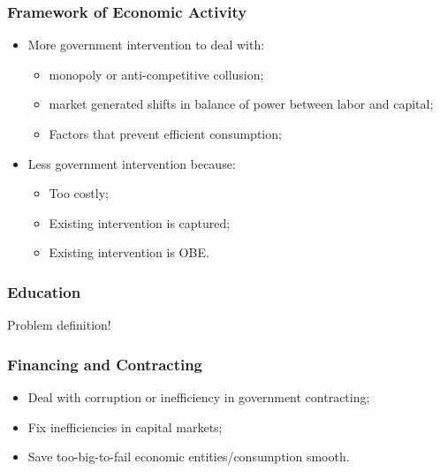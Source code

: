 \documentclass[aspectratio=169]{beamer}
\theoremstyle{principle}
\begin{document}
\begin{frame}
\frametitle{Framework of Economic Activity}
\begin{itemize}
\item More government intervention to deal with:
\begin{itemize} 
\item monopoly or anti-competitive collusion;
\item market generated shifts in balance of power between labor and capital;
\item Factors that prevent efficient consumption;
\end{itemize}
\bigskip
\bigskip
\item Less government intervention because:
\begin{itemize} 
\item Too costly;
\item Existing intervention is captured;
\item Existing intervention is OBE.
\end{itemize}
\end{itemize}
\end{frame}

\begin{frame}
\frametitle{Education}

\begin{center}
\Huge Problem definition!
\end{center}

\end{frame}

\begin{frame}
\frametitle{Financing and Contracting}
\begin{itemize}
\item Deal with corruption or inefficiency in government contracting;
\bigskip
\bigskip
\bigskip
\item Fix inefficiencies in capital markets;
\bigskip
\bigskip
\bigskip
\item Save too-big-to-fail economic entities/consumption smooth.
\end{itemize}

\end{frame}
\end{document}
